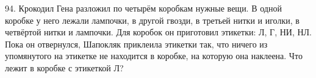 94. Крокодил Гена разложил по четырём коробкам нужные вещи. В одной коробке у него лежали лампочки, в другой гвозди, в третьей нитки и иголки, в четвёртой нитки и лампочки. Для коробок он приготовил этикетки: Л, Г, НИ, НЛ. Пока он отвернулся, Шапокляк приклеила этикетки так, что ничего из упомянутого на этикетке не находится в коробке, на которую она наклеена. Что лежит в коробке с этикеткой Л?\\
